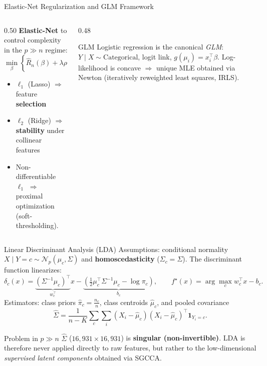 \documentclass[aspectratio=169, 10pt]{beamer}
\begin{document}
\begin{frame}{Elastic-Net Regularization and GLM Framework}
  \begin{columns}[T]
    \begin{column}{0.50\textwidth}
      \textbf{Elastic-Net} to control complexity in the $p \gg n$ regime:
      \[
        \min_\beta \left\{ \hat{R}_n(\beta) + \lambda\rho\|\beta\|_1 + \frac{\lambda(1-\rho)}{2}\|\beta\|_2^2 \right\}
      \]
      \vspace{0.2cm}
      \begin{itemize}
        \item $\ell_1$ (Lasso) $\Rightarrow$ feature \textbf{selection}
        \item $\ell_2$ (Ridge) $\Rightarrow$ \textbf{stability} under collinear features
        \item Non-differentiable $\ell_1$ $\Rightarrow$ proximal optimization (soft-thresholding).
      \end{itemize}
    \end{column}

    \begin{column}{0.48\textwidth}
      \begin{block}{GLM}
        Logistic regression is the canonical \textit{GLM}: $Y \mid X \sim \text{Categorical}$, logit link, $g(\mu_i) = x_i^\top \beta$. Log-likelihood is concave $\Rightarrow$ unique MLE obtained via Newton (iteratively reweighted least squares, IRLS).
      \end{block}
    \end{column}
  \end{columns}
\end{frame}

\begin{frame}{Linear Discriminant Analysis (LDA)}
  Assumptions: conditional normality $X \mid Y = c \sim \mathcal{N}_p(\mu_c, \Sigma)$ and \textbf{homoscedasticity} ($\Sigma_c = \Sigma$). The discriminant function linearizes:
  \[
    \delta_c(x) = \underbrace{(\Sigma^{-1}\mu_c)^\top}_{w_c^\top} x - \underbrace{\left(\tfrac{1}{2}\mu_c^\top \Sigma^{-1}\mu_c - \log \pi_c\right)}_{b_c}, \qquad f^\star(x) = \arg\max_c w_c^\top x - b_c.
  \]
  Estimators: class priors $\hat{\pi}_c = \frac{n_c}{n}$, class centroids $\hat{\mu}_c$, and pooled covariance
  \[
    \hat{\Sigma} = \frac{1}{n-K} \sum_c \sum_i (X_i - \hat{\mu}_c)(X_i - \hat{\mu}_c)^\top \mathbf{1}_{Y_i = c}.
  \]

  \medskip
  \begin{alertblock}{Problem in $p \gg n$}
    $\hat{\Sigma}$ ($16{,}931 \times 16{,}931$) is \textbf{singular (non-invertible)}. LDA is therefore never applied directly to raw features, but rather to the low-dimensional \textit{supervised latent components} obtained via SGCCA.
  \end{alertblock}
\end{frame}
\end{document}
